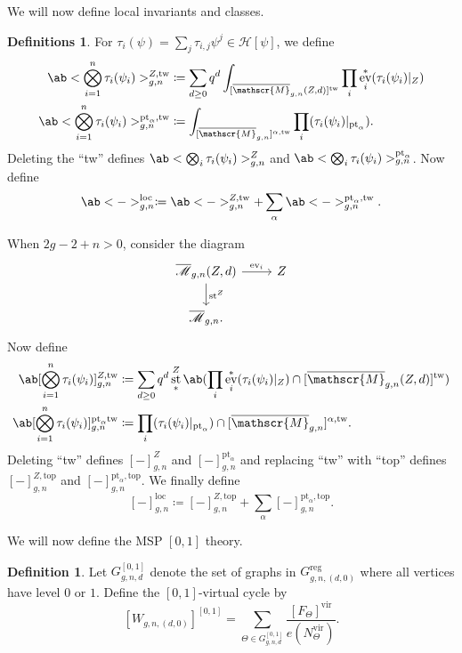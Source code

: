 \documentclass[10pt]{amsart}
\theoremstyle{definition}
\newtheorem{defn}[thm]{Definition}
\newtheorem{defns}[thm]{Definitions}
\theoremstyle{remark}
\theoremstyle{plain}
\theoremstyle{definition}
\theoremstyle{remark}
\newcommand{\msc}[1]{\mathscr{#1}}
\newcommand{\mr}[1]{\mathrm{#1}}
\newcommand{\ol}[1]{\overline{#1}}
\newcommand{\1}{\mathbf{1}}
\newcommand{\2}{\mathbf{2}}
\newcommand{\3}{\mathbf{3}}
\newcommand{\vir}{\mr{vir}}
\newcommand{\pt}{\mr{pt}}
\newcommand{\loc}{\mr{loc}}
\newcommand{\tw}{\mr{tw}}
\renewcommand{\top}{\mr{top}}
\DeclareMathOperator{\ev}{ev}
\DeclareMathOperator{\st}{st}
\numberwithin{equation}{section}
\begin{document}
We will now define local invariants and classes.
\begin{defns}
    For $\tau_i(\psi) = \sum_j \tau_{i,j} \psi^j \in \msc{H}[\psi]$, we define
    \begin{align*}
        \ab<\bigotimes_{i=1}^n \tau_i(\psi_i)>_{g,n}^{Z, \tw} &\coloneqq \sum_{d \geq 0} q^d \int_{[\ol{\msc{M}}_{g,n}(Z,d)]^{\tw}} \prod_i \ev_i^*(\tau_i(\psi_i)|_{Z}) \\
        \ab<\bigotimes_{i=1}^n \tau_i(\psi_i)>_{g,n}^{\pt_{\alpha}, \tw} &\coloneqq \int_{[\ol{\msc{M}}_{g,n}]^{\alpha, \tw}} \prod_i (\tau_i(\psi_i)|_{\pt_{\alpha}}).
    \end{align*}
    Deleting the ``tw'' defines $\ab<\bigotimes_i \tau_i(\psi_i)>_{g,n}^{Z}$ and $\ab<\bigotimes_i \tau_i(\psi_i)>_{g,n}^{\pt_{\alpha}}$. Now define
    \[ \ab<->_{g,n}^{\loc} \coloneqq \ab<->_{g,n}^{Z, \tw} + \sum_{\alpha} \ab<->_{g,n}^{\pt_{\alpha}, \tw}. \]

    When $2g-2+n > 0$, consider the diagram
    \begin{equation*}
    \begin{tikzcd}
        \ol{ \msc{M} }_{g,n}(Z, d) \ar{r}{\ev_i} \ar{d}{\st^{Z}} & Z \\
        \ol{\msc{M}}_{g,n}.
    \end{tikzcd}
    \end{equation*}
    Now define
    \begin{align*}
        \ab[\bigotimes_{i=1}^n \tau_i(\psi_i)]^{Z, \tw}_{g,n} &\coloneqq \sum_{d \geq 0} q^d \st^{Z}_* \ab(\prod_i \ev_i^*(\tau_i(\psi_i)|_{Z}) \cap [\ol{\msc{M}}_{g,n}(Z, d)]^{\tw}) \\
        \ab[\bigotimes_{i=1}^n \tau_i(\psi_i)]^{\pt_{\alpha} \tw}_{g,n} &\coloneqq \prod_i (\tau_i(\psi_i)|_{\pt_{\alpha}}) \cap [\ol{\msc{M}}_{g,n}]^{\alpha, \tw}.
    \end{align*}
    Deleting ``tw'' defines $[-]_{g,n}^{Z}$ and $[-]_{g,n}^{\pt_{\alpha}}$ and replacing ``tw'' with ``top'' defines $[-]_{g,n}^{Z, \top}$ and $[-]_{g,n}^{\pt_{\alpha}, \top}$. We finally define
    \begin{equation}\label{eqn:localcohft}
    [-]_{g,n}^{\loc} \coloneqq [-]_{g,n}^{Z, \top} + \sum_{\alpha} [-]_{g,n}^{\pt_{\alpha}, \top}. 
    \end{equation}
\end{defns}

We will now define the MSP $[0,1]$ theory.
\begin{defn}
    Let $G_{g,n,d}^{[0,1]}$ denote the set of graphs in $G_{g,n,(d,0)}^{\mr{reg}}$ where all vertices have level $0$ or $1$. Define the $[0,1]$-virtual cycle by
    \[ [W_{g,n,(d,0)}]^{[0,1]} = \sum_{\Theta \in G_{g,n,d}^{[0,1]}} \frac{[F_{\Theta}]^{\vir}}{e(N_{\Theta}^{\vir})}. \]
\end{defn}
\end{document}
